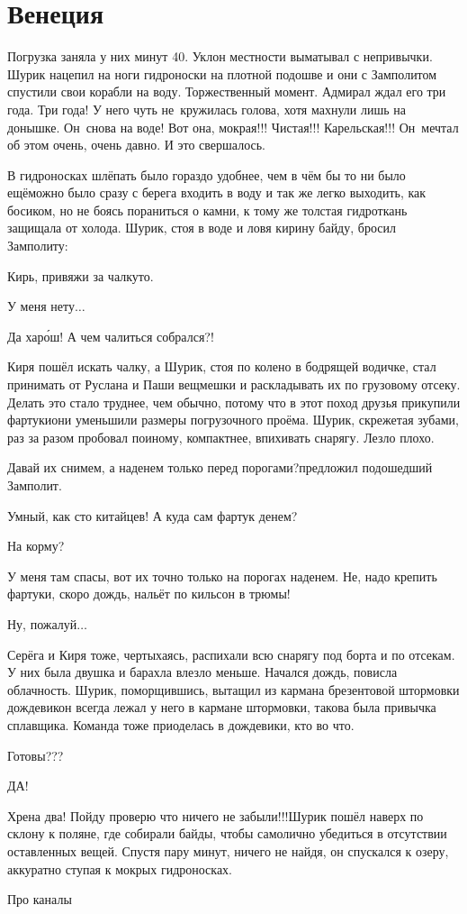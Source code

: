\chapter{Венеция}
\vepsianrose

Погрузка заняла у них минут 40. Уклон местности выматывал с непривычки. Шурик нацепил на ноги гидроноски на плотной подошве и они с Замполитом спустили свои корабли на воду. Торжественный момент. Адмирал ждал его три года. Три года! У него чуть не~кружилась голова, хотя махнули лишь на донышке. Он~снова на воде! Вот она, мокрая!!! Чистая!!! Карельская!!! Он~мечтал об этом очень, очень давно. И это свершалось.

В гидроносках шлёпать было гораздо удобнее, чем в чём бы то ни было ещё\mdash можно было сразу с берега входить в воду и так же легко выходить, как босиком, но не боясь пораниться о камни, к тому же толстая гидроткань защищала от холода. Шурик, стоя в воде и ловя кирину байду, бросил Замполиту:

\mdash Кирь, привяжи за чалку\sdash то.

\mdash У меня нету$\ldots$

\mdash Да хар\'{о}ш! А чем чалиться собрался?!

Киря пошёл искать чалку, а Шурик, стоя по колено в бодрящей водичке, стал принимать от Руслана и Паши вещмешки и раскладывать их по грузовому отсеку. Делать это стало труднее, чем обычно, потому что в этот поход друзья прикупили фартуки\mdash они уменьшили размеры погрузочного проёма. Шурик, скрежетая зубами, раз за разом пробовал по\sdash иному, компактнее, впихивать снарягу. Лезло плохо. 

\mdash Давай их снимем, а наденем только перед порогами?\mdash предложил подошедший Замполит. 

\mdash Умный, как сто китайцев! А куда сам фартук денем? 

\mdash На корму?

\mdash У меня там спасы, вот их точно только на порогах наденем. Не, надо крепить фартуки, скоро дождь, нальёт по кильсон в трюмы!

\mdash Ну, пожалуй$\ldots$

Серёга и Киря тоже, чертыхаясь, распихали всю снарягу под борта и по отсекам. У них была двушка и барахла влезло меньше. Начался дождь, повисла облачность. Шурик, поморщившись, вытащил из кармана брезентовой штормовки дождевик\mdash он всегда лежал у него в кармане штормовки, такова была привычка сплавщика. Команда тоже приоделась в дождевики, кто во что.

\mdash Готовы???

\mdash ДА!

\mdash Хрена два! Пойду проверю что ничего не забыли!!!\mdash Шурик пошёл наверх по склону к поляне, где собирали байды, чтобы самолично убедиться в отсутствии оставленных вещей. Спустя пару минут, ничего не найдя, он спускался к озеру, аккуратно ступая к мокрых гидроносках.


Про каналы

\begin{center}
\end{center}
